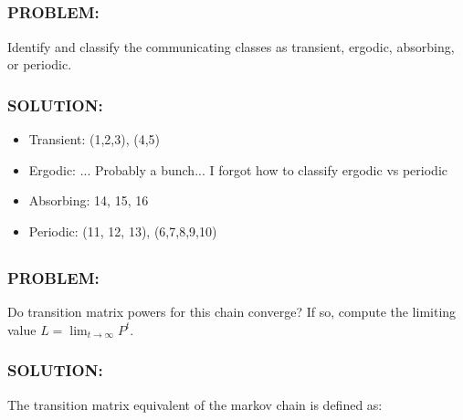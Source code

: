 \documentclass[]{article}
\newcommand{\Problem}{\subsubsection*{\textbf{PROBLEM:}}}
\newcommand{\Solution}{\subsubsection*{\textbf{SOLUTION:}}}
\begin{document}
\subsection{}
\Problem
Identify and classify the communicating classes as transient, ergodic, absorbing, or periodic.
\Solution
\begin{itemize}
    \item Transient: (1,2,3), (4,5)
    \item Ergodic: ... Probably a bunch... I forgot how to classify ergodic vs periodic
    \item Absorbing: 14, 15, 16
    \item Periodic: (11, 12, 13), (6,7,8,9,10)
\end{itemize}


\subsection{}
\Problem
Do transition matrix powers for this chain converge? If so, compute the limiting value $L = \lim_{t \to \infty} P^t$.
\Solution
The transition matrix equivalent of the markov chain is defined as:
\end{document}
